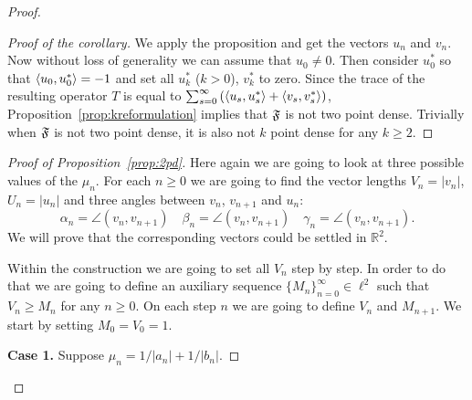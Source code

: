 \begin{proof}
\begin{proof}[Proof of the corollary]
        We apply the proposition and get the vectors $u_n$ and $v_n$.
        Now without loss of generality we can assume that $u_0 \neq 0$.
        Then consider $u^*_0$ so that $\langle u_0, u^*_0 \rangle = -1$ and set all $u^*_k$ ($k > 0$), $v^*_k$ to zero.
        Since the trace of the resulting operator $T$ is equal to $\sum_{s=0}^\infty \left(\langle u_s, u^*_s \rangle + \langle v_s, v^*_s \rangle\right)$,
          Proposition~\ref{prop:kreformulation} implies that $\mathfrak{F}$ is not two point dense.
        Trivially when $\mathfrak{F}$ is not two point dense, it is also not $k$ point dense for any $k \geq 2$.
      \end{proof}
      \begin{proof}[Proof of Proposition~\ref{prop:2pd}]
        Here again we are going to look at three possible values of the $\mu_n$.
        For each $n \geq 0$ we are going to find the vector lengths $V_n = |v_n|$, $U_n = |u_n|$ and three angles between $v_n$, $v_{n+1}$ and $u_n$:
        \[
          \alpha_n = \angle (v_n, v_{n+1}) \quad
          \beta_n = \angle (v_n, v_{n+1}) \quad
          \gamma_n = \angle (v_n, v_{n+1}).
        \]
        We will prove that the corresponding vectors could be settled in $\mathbb{R}^2$.

        Within the construction we are going to set all $V_n$ step by step.
        In order to do that we are going to define an auxiliary sequence $\{M_n\}_{n=0}^\infty \in \ell^2$ such that $V_n \geq M_n$ for any $n \geq 0$.
        On each step $n$ we are going to define $V_n$ and $M_{n+1}$.
        We start by setting $M_0 = V_0 = 1$.

        \noindent\textbf{Case 1.} Suppose $\mu_n = 1/|a_n| + 1/|b_n|$.


\end{proof}
\end{proof}
